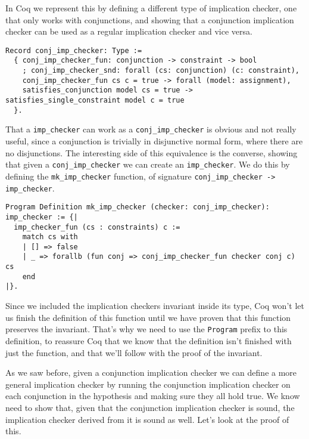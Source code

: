 In Coq we represent this by defining a different type of implication checker, one that only works with 
conjunctions, and showing that a conjunction implication checker can be used as a regular implication
checker and vice versa.

\begin{verbatim}
Record conj_imp_checker: Type := 
  { conj_imp_checker_fun: conjunction -> constraint -> bool
    ; conj_imp_checker_snd: forall (cs: conjunction) (c: constraint),
    conj_imp_checker_fun cs c = true -> forall (model: assignment),
    satisfies_conjunction model cs = true -> satisfies_single_constraint model c = true
  }.
\end{verbatim}

That a \texttt{imp_checker} can work as a \texttt{conj_imp_checker} is obvious and not really useful, since a conjunction
is trivially in disjunctive normal form, where there are no disjunctions. The interesting side of this 
equivalence is the converse, showing that given a \texttt{conj_imp_checker} we can create an \texttt{imp_checker}. We do
this by defining the \texttt{mk_imp_checker} function, of signature \texttt{conj_imp_checker -> imp_checker}.

\begin{verbatim}
Program Definition mk_imp_checker (checker: conj_imp_checker): imp_checker := {|
  imp_checker_fun (cs : constraints) c := 
    match cs with
    | [] => false
    | _ => forallb (fun conj => conj_imp_checker_fun checker conj c) cs
    end
|}.
\end{verbatim}

Since we included the implication checkers invariant inside its type, Coq won't let us finish the definition
of this function until we have proven that this function preserves the invariant. That's why we need to use
the \texttt{Program} prefix to this definition, to reassure Coq that we know that the definition isn't finished 
with just the function, and that we'll follow with the proof of the invariant.

As we saw before, given a conjunction implication checker we can define a more general implication checker
by running the conjunction implication checker on each conjunction in the hypothesis and making sure they 
all hold true. We know need to show that, given that the conjunction implication checker is sound, the
implication checker derived from it is sound as well. Let's look at the proof of this.

